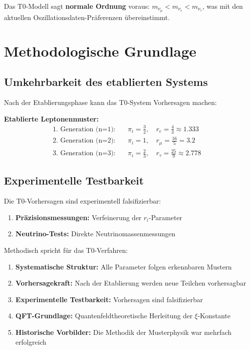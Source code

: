 \begin{important}
	Das T0-Modell sagt \textbf{normale Ordnung} voraus: $m_{\nu_\mu} < m_{\nu_e} < m_{\nu_\tau}$, was mit den aktuellen Oszillationsdaten-Präferenzen übereinstimmt.
\end{important}

\section{Methodologische Grundlage}
\label{sec:scientific_legitimacy}

\subsection{Umkehrbarkeit des etablierten Systems}
\label{subsec:reversibility}

Nach der Etablierungsphase kann das T0-System Vorhersagen machen:

\textbf{Etablierte Leptonenmuster:}
\begin{align}
	\text{1. Generation (n=1):} \quad &\pi_i = \frac{3}{2}, \quad r_e = \frac{4}{3} \approx 1.333 \\
	\text{2. Generation (n=2):} \quad &\pi_i = 1, \quad r_\mu = \frac{16}{5} = 3.2 \\
	\text{3. Generation (n=3):} \quad &\pi_i = \frac{2}{3}, \quad r_\tau = \frac{25}{9} \approx 2.778
\end{align}


\subsection{Experimentelle Testbarkeit}
\label{subsec:experimental_testability}

Die T0-Vorhersagen sind experimentell falsifizierbar:

\begin{enumerate}
	\item \textbf{Präzisionsmessungen:} Verfeinerung der $r_i$-Parameter
	\item \textbf{Neutrino-Tests:} Direkte Neutrinomassenmessungen
\end{enumerate}

Methodisch spricht für das T0-Verfahren:

\begin{enumerate}
	\item \textbf{Systematische Struktur:} Alle Parameter folgen erkennbaren Mustern
	\item \textbf{Vorhersagekraft:} Nach der Etablierung werden neue Teilchen vorhersagbar
	\item \textbf{Experimentelle Testbarkeit:} Vorhersagen sind falsifizierbar
	\item \textbf{QFT-Grundlage:} Quantenfeldtheoretische Herleitung der $\xi$-Konstante
	\item \textbf{Historische Vorbilder:} Die Methodik der Musterphysik war mehrfach erfolgreich
\end{enumerate}

